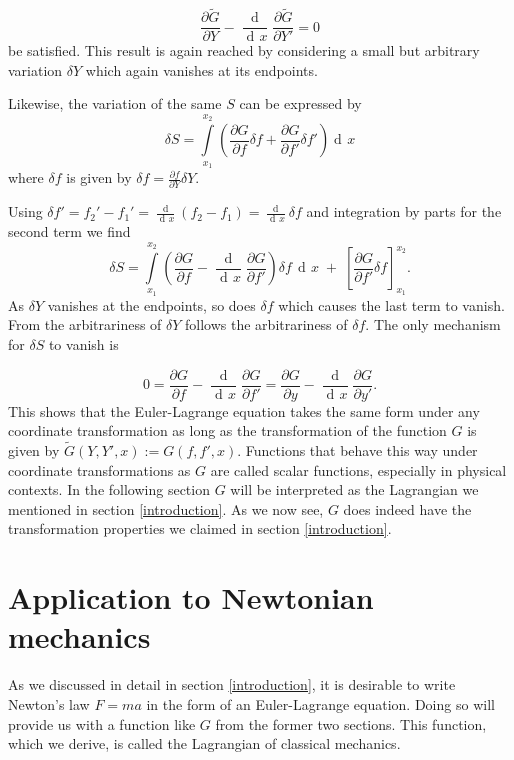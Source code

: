 \documentclass[prb,preprint]{revtex4-1}
\DeclareMathOperator{\dd}{d\!}
\DeclareMathOperator{\ddd}{\mathrm{d}}
\begin{document}
\begin{equation}
\frac{\partial \widetilde{G}}{\partial Y}
- \frac{\ddd}{\dd x}\frac{\partial \widetilde{G}}{\partial Y'} = 0
\end{equation}
be satisfied. This result is again reached by considering a small but arbitrary variation $\delta Y$ which again vanishes at its endpoints.

Likewise, the variation of the same $S$ can be expressed by
\begin{equation}
\delta S = \int\limits_{x_1}^{x_2} \left( \frac{\partial G}{\partial f} \delta f
+ \frac{\partial G}{\partial f'} \delta f' \right) \dd x
\end{equation}
where $\delta f$ is given by $\delta f = \frac{\partial f}{\partial Y} \delta Y$.


Using $\delta f' = f_2' - f_1' = \frac{\ddd}{\dd x}(f_2 - f_1) = \frac{\dd}{\dd x} \delta f$ and integration by parts for the second term we find
\begin{equation}
\delta S = \int\limits_{x_1}^{x_2} \left( \frac{\partial G}{\partial f}
- \frac{\ddd}{\dd x} \frac{\partial G}{\partial f'} \right) \delta f \, \dd x \;
+ \; \left[\frac{\partial G}{\partial f'} \delta f \right]_{x_1}^{x_2}.
\end{equation}
As $\delta Y$ vanishes at the endpoints, so does $\delta f$ which causes the last term to vanish. From the arbitrariness of $\delta Y$ follows the arbitrariness of $\delta f$. The only mechanism for $\delta S$ to vanish is

\begin{equation}
0 = \frac{\partial G}{\partial f} - \frac{\ddd}{\dd x} \frac{\partial G}{\partial f'}
= \frac{\partial G}{\partial y} - \frac{\ddd}{\dd x} \frac{\partial G}{\partial y'}.
\end{equation}
This shows that the Euler-Lagrange equation takes the same form under any coordinate transformation as long as the transformation of the function $G$ is given by $\widetilde{G}(Y,Y',x) := G(f,f',x)$. Functions that behave this way under coordinate transformations as $G$ are called scalar functions, especially in physical contexts.
In the following section $G$ will be interpreted as the Lagrangian we mentioned in section \ref{introduction}. As we now see, $G$ does indeed have the transformation properties we claimed in section \ref{introduction}.

\section{Application to Newtonian mechanics} \label{application}
As we discussed in detail in section \ref{introduction}, it is desirable to write Newton's law $F=ma$ in the form of an Euler-Lagrange equation. Doing so will provide us with a function like $G$ from the former two sections. This function, which we derive, is called the Lagrangian of classical mechanics.
\end{document}
